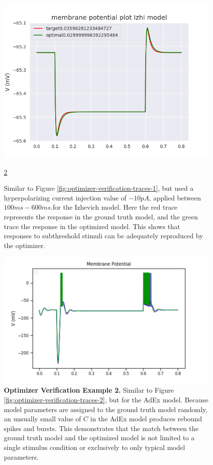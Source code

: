 \begin{figure}
    \centering
    \includegraphics[scale=0.85]{figures/capacitance.png}
    \caption[Optimizer verification example 2]{
    Similar to Figure
    \ref{fig:optimizer-verification-traces-1}, but used a hyperpolarizing current injection value of $-10pA$, applied between $100ms-600ms$.for the Izhevich model.
    Here the red trace represents the response in the ground truth model, and the green trace the response in the optimized model.
    This shows that responses to subthreshold stimuli can be adequately reproduced by the optimizer.}
    \ref{fig:adexp_model_rebound_spike} 
    \label{fig:optimizer-verification-traces-3}
\end{figure}

\begin{figure}
    \centering
    \includegraphics[scale=0.85]{figures/simulated_data_sub_threshold.png}
    \caption[Optimizer verification example 3]{\textbf{Optimizer Verification Example 2.}
    Similar to Figure
    \ref{fig:optimizer-verification-traces-2}, but for the AdEx model.
    Because model parameters are assigned to the ground truth model randomly, an unsually small value of $C$ in the AdEx model produces rebound spikes and bursts.
    This demonstrates that the match between the ground truth model and the optimized model is not limited to a single stimulus condition or exclusively to only typical model parameters.}
    \label{fig:adexp_model_rebound_spike}
\end{figure}

